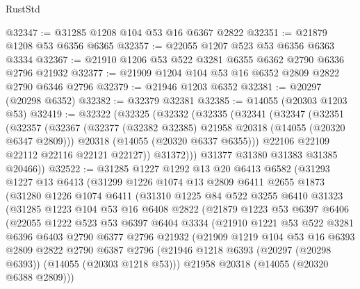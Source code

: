 \begin{lexlean}{RustStd}
\begin{coremodule}
@32347 := @31285 @1208 @104 @53 @16 @6367 @2822
@32351 := @21879 @1208 @53 @6356 @6365
@32357 := @22055 @1207 @523 @53 @6356 @6363 @3334
@32367 := @21910 @1206 @53 @522 @3281 @6355 @6362 @2790 @6336 @2796 @21932
@32377 := @21909 @1204 @104 @53 @16 @6352 @2809 @2822 @2790 @6346 @2796
@32379 := @21946 @1203 @6352
@32381 := @20297 (@20298 @6352)
@32382 := @32379 @32381
@32385 := @14055 (@20303 @1203 @53)
@32419 := @32322
    (@32325
      (@32332
        (@32335
          (@32341
            (@32347
              (@32351
                (@32357
                  (@32367
                    (@32377 (@32382 @32385) @21958 @20318 (@14055 (@20320 @6347 @2809)))
                    @20318
                    (@14055 (@20320 @6337 @6355)))
                  @22106
                  @22109
                  @22112
                  @22116
                  @22121
                  @22127))
              @31372)))
        @31377
        @31380
        @31383
        @31385
        @20466))
@32522 := @31285
    @1227
    @1292
    @13
    @20
    @6413
    @6582
    (@31293
      @1227
      @13
      @6413
      (@31299
        @1226
        @1074
        @13
        @2809
        @6411
        @2655
        @1873
        (@31280
          @1226
          @1074
          @6411
          (@31310
            @1225
            @84
            @522
            @3255
            @6410
            @31323
            (@31285
              @1223
              @104
              @53
              @16
              @6408
              @2822
              (@21879
                @1223
                @53
                @6397
                @6406
                (@22055
                  @1222
                  @523
                  @53
                  @6397
                  @6404
                  @3334
                  (@21910
                    @1221
                    @53
                    @522
                    @3281
                    @6396
                    @6403
                    @2790
                    @6377
                    @2796
                    @21932
                    (@21909
                      @1219
                      @104
                      @53
                      @16
                      @6393
                      @2809
                      @2822
                      @2790
                      @6387
                      @2796
                      (@21946 @1218 @6393 (@20297 (@20298 @6393)) (@14055 (@20303 @1218 @53)))
                      @21958
                      @20318
                      (@14055 (@20320 @6388 @2809)))

\end{coremodule}
\end{lexlean}
